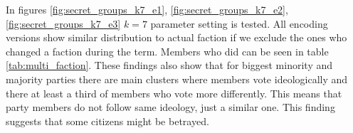 \documentclass[a4paper,12pt]{article}
\begin{document}
	In figures \ref{fig:secret_groups_k7_e1},  \ref{fig:secret_groups_k7_e2}, \ref{fig:secret_groups_k7_e3} $k=7$ parameter setting is tested. All encoding versions show similar distribution to actual faction if we exclude the ones who changed a faction during the term. Members who did can be seen in table \ref{tab:multi_faction}. These findings also show that for biggest minority and majority parties there are main clusters where members vote ideologically and there at least a third of members who vote more differently. This means that party members do not follow same ideology, just a similar one. This finding suggests that some citizens might be betrayed.
	
	\begin{figure}[!tbp]
		\centering
		\hfill
		\hfill

\end{figure}
\end{document}
